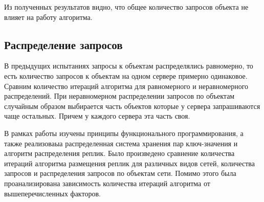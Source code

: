 			Из полученных результатов видно, что общее количество запросов объекта не влияет на работу алгоритма.

		\subsection{Распределение запросов}
			В предыдущих испытаниях запросы к объектам распределялись равномерно, то есть количество запросов к объектам на одном сервере примерно одинаковое. Сравним количество итераций 
			алгоритма для равномерного и неравномерного распределений. При неравномерном распределении запросов по объектам случайным образом выбирается часть объектов которые у сервера 
			запрашиваются чаще остальных. Причем у каждого сервера эта часть своя.


	
\newpage		
		
\Conc

	В рамках работы изучены принципы функционального программирования, а также реализоваыа распределенная система хранения пар ключ-значения и алгоритм распределения реплик.
	Было произведено сравнение количества итераций алгоритма размещения реплик для различных видов сетей, количества запросов и распределения запросов по объектам сети.
	Помимо этого была проанализирована зависимость количества итераций алгоритма от вышеперечисленных факторов.
\newpage

\printbibliography[%
    heading=bibintoc%
]



